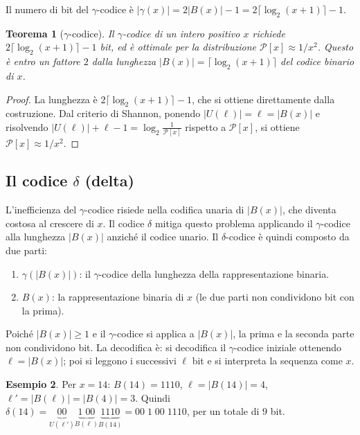 \documentclass[12pt, a4paper, oneside]{book}
\theoremstyle{plain}
\newtheorem{teorema}{Teorema}[chapter]
\theoremstyle{definition}
\newtheorem{esempio}[teorema]{Esempio}
\theoremstyle{remark}
\begin{document}
Il numero di bit del $\gamma$-codice è $|\gamma(x)| = 2|B(x)| - 1 = 2\lceil \log_2(x+1) \rceil - 1$.

\begin{teorema}[$\gamma$-codice]
\label{thm:gamma-code}
Il $\gamma$-codice di un intero positivo $x$ richiede $2\lceil \log_2(x+1) \rceil - 1$ bit, ed è ottimale per la distribuzione $\mathcal{P}[x] \approx 1/x^2$. Questo è entro un fattore $2$ dalla lunghezza $|B(x)| = \lceil \log_2(x+1) \rceil$ del codice binario di $x$.
\end{teorema}

\begin{proof}
La lunghezza è $2\lceil \log_2(x+1) \rceil - 1$, che si ottiene direttamente dalla costruzione. Dal criterio di Shannon, ponendo $|U(\ell)| = \ell = |B(x)|$ e risolvendo $|U(\ell)| + \ell - 1 = \log_2 \frac{1}{\mathcal{P}[x]}$ rispetto a $\mathcal{P}[x]$, si ottiene $\mathcal{P}[x] \approx 1/x^2$.
\end{proof}

\subsection{Il codice $\delta$ (delta)}

L'inefficienza del $\gamma$-codice risiede nella codifica unaria di $|B(x)|$, che diventa costosa al crescere di $x$. Il codice $\delta$ mitiga questo problema applicando il $\gamma$-codice alla lunghezza $|B(x)|$ anziché il codice unario. Il $\delta$-codice è quindi composto da due parti:
\begin{enumerate}
  \item $\gamma(|B(x)|)$: il $\gamma$-codice della lunghezza della rappresentazione binaria.
  \item $B(x)$: la rappresentazione binaria di $x$ (le due parti non condividono bit con la prima).
\end{enumerate}

Poiché $|B(x)| \geq 1$ e il $\gamma$-codice si applica a $|B(x)|$, la prima e la seconda parte non condividono bit. La decodifica è: si decodifica il $\gamma$-codice iniziale ottenendo $\ell = |B(x)|$; poi si leggono i successivi $\ell$ bit e si interpreta la sequenza come $x$.

\begin{esempio}
Per $x = 14$: $B(14) = 1110$, $\ell = |B(14)| = 4$, $\ell' = |B(\ell)| = |B(4)| = 3$. Quindi $\delta(14) = \underbrace{00}_{U(\ell')} \underbrace{1\;00}_{B(\ell)} \underbrace{1110}_{B(14)} = 00\;1\;00\;1110$, per un totale di $9$ bit.
\end{esempio}
\end{document}
